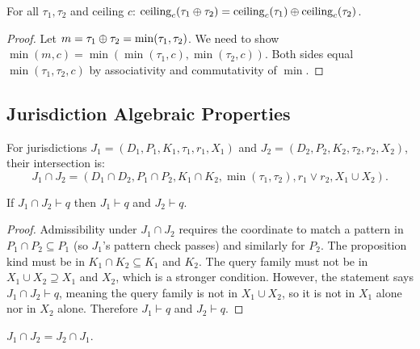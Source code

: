 \documentclass[11pt]{article}
\newcommand{\TrustCeil}{\mathrm{ceiling}}
\begin{document}
\begin{lemma}
\label{lem:ceil-meet}
For all $\tau_1, \tau_2$ and ceiling $c$:
$\TrustCeil_c(\tau_1 \tjoin \tau_2) = \TrustCeil_c(\tau_1) \tjoin \TrustCeil_c(\tau_2)$.
\end{lemma}

\begin{proof}
Let $m = \tau_1 \oplus \tau_2 = \min(\tau_1, \tau_2)$.
We need to show $\min(m, c) = \min(\min(\tau_1, c), \min(\tau_2, c))$.
Both sides equal $\min(\tau_1, \tau_2, c)$ by associativity and
commutativity of $\min$.
\end{proof}

\subsection{Jurisdiction Algebraic Properties}
\label{app:jurisdiction}

\begin{definition}
\label{def:juris-intersect}
For jurisdictions $J_1 = (D_1, P_1, K_1, \tau_1, r_1, X_1)$ and
$J_2 = (D_2, P_2, K_2, \tau_2, r_2, X_2)$, their intersection is:
\[
  J_1 \cap J_2 = (D_1 \cap D_2, P_1 \cap P_2, K_1 \cap K_2,
  \min(\tau_1, \tau_2), r_1 \vee r_2, X_1 \cup X_2).
\]
\end{definition}

\begin{lemma}
\label{lem:intersect-admis}
If $J_1 \cap J_2 \vdash q$ then $J_1 \vdash q$ and $J_2 \vdash q$.
\end{lemma}

\begin{proof}
Admissibility under $J_1 \cap J_2$ requires the coordinate to
match a pattern in $P_1 \cap P_2 \subseteq P_1$ (so $J_1$'s
pattern check passes) and similarly for $P_2$.  The proposition
kind must be in $K_1 \cap K_2 \subseteq K_1$ and $K_2$.  The
query family must not be in $X_1 \cup X_2 \supseteq X_1$ and
$X_2$, which is a stronger condition.  However, the statement
says $J_1 \cap J_2 \vdash q$, meaning the query family is not
in $X_1 \cup X_2$, so it is not in $X_1$ alone nor in $X_2$ alone.
Therefore $J_1 \vdash q$ and $J_2 \vdash q$.
\end{proof}

\begin{lemma}
\label{lem:juris-comm}
$J_1 \cap J_2 = J_2 \cap J_1$.
\end{lemma}
\end{document}
